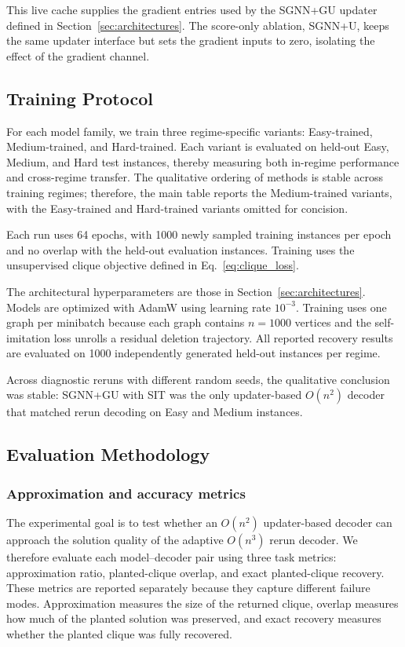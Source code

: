 \documentclass[mathematics,article,submit,pdftex,moreauthors]{Definitions/mdpi}
\begin{document}
This live cache supplies the gradient entries used by the \textsc{SGNN+GU} updater
defined in Section~\ref{sec:architectures}. The score-only ablation,
\textsc{SGNN+U}, keeps the same updater interface but sets the gradient inputs to
zero, isolating the effect of the gradient channel.

\subsection{Training Protocol}
\label{sec:training}

For each model family, we train three regime-specific variants: Easy-trained,
Medium-trained, and Hard-trained. Each variant is evaluated on held-out Easy,
Medium, and Hard test instances, thereby measuring both in-regime performance and
cross-regime transfer. The qualitative ordering of methods is stable across
training regimes; therefore, the main table reports the Medium-trained variants,
with the Easy-trained and Hard-trained variants omitted for concision.

Each run uses 64 epochs, with 1000 newly sampled training instances per epoch and
no overlap with the held-out evaluation instances. Training uses the unsupervised
clique objective defined in Eq.~\eqref{eq:clique_loss}.

The architectural hyperparameters are those in Section~\ref{sec:architectures}.
Models are optimized with AdamW using learning rate $10^{-3}$. Training uses one
graph per minibatch because each graph contains $n=1000$ vertices and the
self-imitation loss unrolls a residual deletion trajectory. All reported recovery
results are evaluated on 1000 independently generated held-out instances per
regime.

Across diagnostic reruns with different random seeds, the qualitative conclusion
was stable: \textsc{SGNN+GU} with SIT was the only updater-based $O(n^2)$ decoder that
matched rerun decoding on Easy and Medium instances.

\subsection{Evaluation Methodology}
\label{sec:evaluation_methodology}

\subsubsection{Approximation and accuracy metrics}

The experimental goal is to test whether an $O(n^2)$ updater-based decoder can
approach the solution quality of the adaptive $O(n^3)$ rerun decoder. We therefore
evaluate each model--decoder pair using three task metrics: approximation ratio,
planted-clique overlap, and exact planted-clique recovery. These metrics are
reported separately because they capture different failure modes. Approximation
measures the size of the returned clique, overlap measures how much of the planted
solution was preserved, and exact recovery measures whether the planted clique was
fully recovered.
\end{document}
